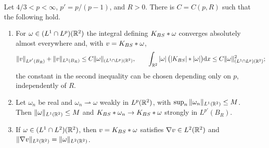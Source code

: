 \begin{lemma}
\label{lem:velocity}
Let $4/3<p<\infty$, $p'=p/(p-1)$, and $R>0$. There is $C=C(p,R)$ such that
the following hold.
\begin{enumerate}[label=\textup{(\alph*)}]
\item For $\omega\in (L^1\cap L^p)(\mathbb{R}^2)$ the integral defining $K_{BS}\ast\omega$
  converges absolutely almost everywhere and, with $v=K_{BS}\ast\omega$,
  \[
  \|v\|_{L^{p'}(B_R)}+\|v\|_{L^2(B_R)}\le C\|\omega\|_{(L^1\cap L^p)(\mathbb{R}^2)},\qquad
  \int_{\mathbb{R}^2}|\omega|\,\big(|K_{BS}|\ast|\omega|\big)\dd x\le C\|\omega\|_{(L^1\cap L^p)(\mathbb{R}^2)}^2 ;
  \]
  the constant in the second inequality can be chosen depending only on $p$,
  independently of $R$.
\item Let $\omega_n$ be real and $\omega_n\rightharpoonup\omega$ weakly in $L^p(\mathbb{R}^2)$, with
  $\sup_n\|\omega_n\|_{L^1(\mathbb{R}^2)}\le M$. Then $\|\omega\|_{L^1(\mathbb{R}^2)}\le M$ and
  $K_{BS}\ast\omega_n\to K_{BS}\ast\omega$ strongly in $L^{p'}(B_R)$.
\item If $\omega\in (L^1\cap L^2)(\mathbb{R}^2)$, then $v=K_{BS}\ast\omega$ satisfies $\nabla v\in L^2(\mathbb{R}^2)$ and
  $\|\nabla v\|_{L^2(\mathbb{R}^2)}=\|\omega\|_{L^2(\mathbb{R}^2)}$.
\end{enumerate}
\end{lemma}

